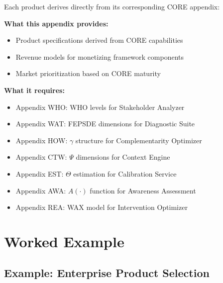 Each product derives directly from its corresponding CORE appendix:

\begin{tcolorbox}[colback=yellow!5!white, colframe=yellow!75!black,
    title=Integration: VVV.3 $\leftrightarrow$ 10C CORE Appendices]
\textbf{What this appendix provides:}
\begin{itemize}[nosep]
\item Product specifications derived from CORE capabilities
\item Revenue models for monetizing framework components
\item Market prioritization based on CORE maturity
\end{itemize}

\textbf{What it requires:}
\begin{itemize}[nosep]
\item Appendix WHO: WHO levels for Stakeholder Analyzer
\item Appendix WAT: FEPSDE dimensions for Diagnostic Suite
\item Appendix HOW: $\gamma$ structure for Complementarity Optimizer
\item Appendix CTW: $\Psi$ dimensions for Context Engine
\item Appendix EST: $\Theta$ estimation for Calibration Service
\item Appendix AWA: $A(\cdot)$ function for Awareness Assessment
\item Appendix REA: WAX model for Intervention Optimizer
\end{itemize}
\end{tcolorbox}



\section{Worked Example}
\label{sec:vvv3-example}

\subsection{Example: Enterprise Product Selection}

